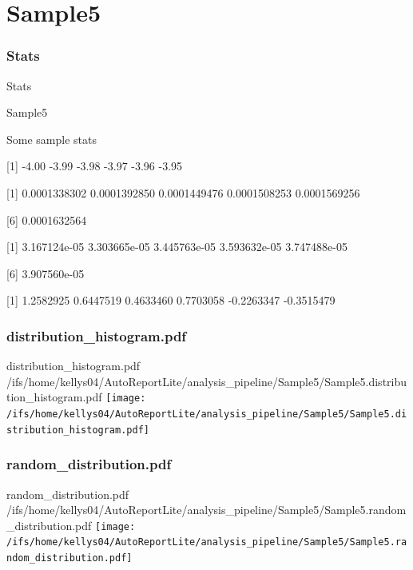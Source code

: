 \documentclass[8pt]{beamer}\usepackage[]{graphicx}\usepackage[]{color}
\begin{document}
\section{Sample5}
\subsubsection{Stats}
\begin{frame}{Stats }
\small{
Sample5 

Some sample stats

[1] -4.00 -3.99 -3.98 -3.97 -3.96 -3.95

[1] 0.0001338302 0.0001392850 0.0001449476 0.0001508253 0.0001569256

[6] 0.0001632564

[1] 3.167124e-05 3.303665e-05 3.445763e-05 3.593632e-05 3.747488e-05

[6] 3.907560e-05

[1]  1.2582925  0.6447519  0.4633460  0.7703058 -0.2263347 -0.3515479
}

\end{frame}

\subsubsection{distribution\_histogram.pdf}
\begin{frame}{distribution\_histogram.pdf }
\scriptsize{/ifs/home/kellys04/AutoReportLite/analysis\_pipeline/Sample5/Sample5.distribution\_histogram.pdf}
\texttt{[image: /ifs/home/kellys04/AutoReportLite/analysis\_pipeline/Sample5/Sample5.distribution\_histogram.pdf]}
\end{frame}

\subsubsection{random\_distribution.pdf}
\begin{frame}{random\_distribution.pdf }
\scriptsize{/ifs/home/kellys04/AutoReportLite/analysis\_pipeline/Sample5/Sample5.random\_distribution.pdf}
\texttt{[image: /ifs/home/kellys04/AutoReportLite/analysis\_pipeline/Sample5/Sample5.random\_distribution.pdf]}
\end{frame}



\end{document}
